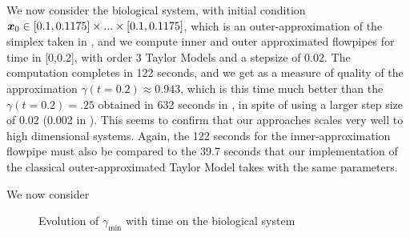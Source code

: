 





We now consider the biological system, with initial condition $\x_0 \in [0.1,0.1175] \times...\times [0.1,0.1175]$, which is an outer-approximation
of the simplex taken in  \cite{Underapproxflowpipes}, and we compute inner and outer approximated flowpipes for time in [0,0.2], 
with order 3 Taylor Models and a stepsize of 0.02. The computation completes in 122 seconds, and we get as a measure of quality of the approximation 
$\gamma(t=0.2) \approx 0.943$, which is this time much better than the $\gamma(t=0.2) = .25$ obtained in 632 seconds in  \cite{Underapproxflowpipes}, in spite of using a larger step size of 0.02 (0.002 in \cite{Underapproxflowpipes}). This seems to confirm that our approaches scales very well to high dimensional systems. 
Again, the 122 seconds for the inner-approximation flowpipe must also be compared to the 39.7 seconds that our implementation of the classical 
outer-approximated Taylor Model takes with the same parameters.


We now consider 
\begin{figure}
\begin{center}
\end{center}
\caption{Evolution of $\gamma_{\min}$ with time on the biological system}
\label{ex:width_sriram_bio}
\end{figure}

